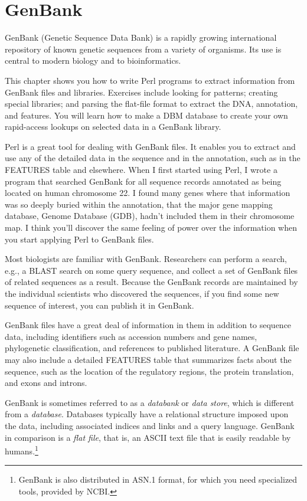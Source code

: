 \chapter{GenBank}
\label{chap:chapter10}
\minitoc

GenBank (Genetic Sequence Data Bank) is a rapidly growing international repository of known genetic sequences from a variety of organisms. Its use is central to modern biology and to bioinformatics.

This chapter shows you how to write Perl programs to extract information from GenBank files and libraries. Exercises include looking for patterns; creating special libraries; and parsing the flat-file format to extract the DNA, annotation, and features. You will learn how to make a DBM database to create your own rapid-access lookups on selected data in a GenBank library.

Perl is a great tool for dealing with GenBank files. It enables you to extract and use any of the detailed data in the sequence and in the annotation, such as in the FEATURES table and elsewhere. When I first started using Perl, I wrote a program that searched GenBank for all sequence records annotated as being located on human chromosome 22. I found many genes where that information was so deeply buried within the annotation, that the major gene mapping database, Genome Database (GDB), hadn't included them in their chromosome map. I think you'll discover the same feeling of power over the information when you start applying Perl to GenBank files.

Most biologists are familiar with GenBank. Researchers can perform a search, e.g., a BLAST search on some query sequence, and collect a set of GenBank files of related sequences as a result. Because the GenBank records are maintained by the individual scientists who discovered the sequences, if you find some new sequence of interest, you can publish it in GenBank.

GenBank files have a great deal of information in them in addition to sequence data, including identifiers such as accession numbers and gene names, phylogenetic classification, and references to published literature. A GenBank file may also include a detailed FEATURES table that summarizes facts about the sequence, such as the location of the regulatory regions, the protein translation, and exons and introns.

GenBank is sometimes referred to as a \textit{databank} or \textit{data store}, which is different from a \textit{database}. Databases typically have a relational structure imposed upon the data, including associated indices and links and a query language. GenBank in comparison is a \textit{flat file}, that is, an ASCII text file that is easily readable by humans.\footnote{GenBank is also distributed in ASN.1 format, for which you need specialized tools, provided by NCBI.}

